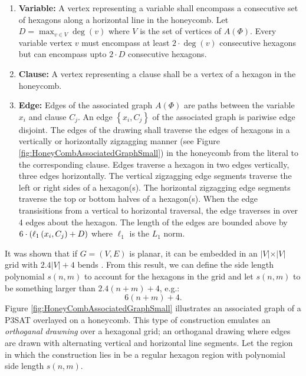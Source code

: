 \begin{enumerate}
\item \textbf{Variable:} A vertex representing a variable shall encompass a consecutive set of hexagons along a horizontal line in the honeycomb. 
Let $D = \max_{v \in V} \deg(v)$ where $V$ is the set of vertices of $A(\Phi)$.
Every variable vertex $v$  must encompass at least $2 \cdot \deg(v)$ consecutive hexagons but can encompass upto $2 \cdot D$ consecutive hexagons.
\item \textbf{Clause:} A vertex representing a clause shall be a vertex of a hexagon in the honeycomb.
\item \textbf{Edge:} Edges of the associated graph $A(\Phi)$ are paths between the variable $x_i$ and clause $C_j$.  An edge $\left\lbrace x_i, C_j \right\rbrace$ of the associated graph is pariwise edge disjoint. 
The edges of the drawing shall traverse the edges of hexagons in a vertically or horizontally zigzagging manner (see Figure \ref{fig:HoneyCombAssociatedGraphSmall}) in the honeycomb from the literal to the corresponding clause. 
Edges traverse a hexagon in two edges vertically, three edges horizontally.  
The vertical zigzagging edge segments traverse the left or right sides of a hexagon(s).
The horizontal zigzagging edge segments traverse the top or bottom halves of a hexagon(s).
When the edge transisitions from a vertical to horizontal traversal, the edge traverses in over 4 edges about the hexagon.
The length of the edges are bounded above by $6 \cdot \left( \ell_1 \left( x_i,C_j \right) + D \right)$ where $\ell_1$ is the $L_1$ norm. 
\end{enumerate}
It was shown that if $G=(V,E)$ is planar, it can be embedded in an $\vert V \vert \times \vert V \vert$ grid with $2.4\vert V\vert + 4$ bends \cite{storer1984minimal,tamassia1987efficient}.
From this result, we can define the side length polynomial $s(n,m)$ to account for the hexagons in the grid and let $s(n,m)$ to be something larger than $2.4(n+m) + 4$, e.g.:
$$6 (n+m) + 4.$$
Figure \ref{fig:HoneyCombAssociatedGraphSmall} illustrates an associated graph of a P3SAT overlayed on a honeycomb.
This type of construction emulates an \textit{orthoganal drawning} over a hexagonal grid; an orthoganal drawing where edges are drawn with alternating vertical and horizontal line segments.
Let the region in which the construction lies in be a regular hexagon region with polynomial side length $s(n,m)$. 

